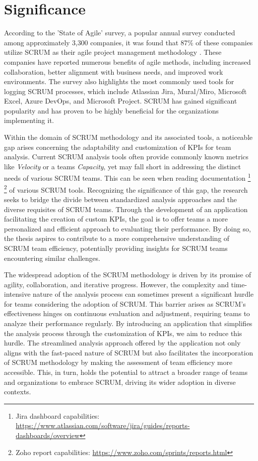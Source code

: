\section{Significance}

According to the 'State of Agile' survey, a popular annual survey conducted among 
approximately 3,300 companies, it was found that 87\% of these companies utilize SCRUM 
as their agile project management methodology \parencite{StateOfAgile2023}. 
These companies have reported numerous benefits of agile methods, including increased 
collaboration, better alignment with business needs, and improved work environments. 
The survey also highlights the most commonly used tools for logging SCRUM processes, which 
include Atlassian Jira, Mural/Miro, Microsoft Excel, Azure DevOps, and Microsoft Project. 
SCRUM has gained significant popularity and has proven to be highly beneficial for the 
organizations implementing it.

Within the domain of SCRUM methodology and its associated tools, a noticeable 
gap arises concerning the adaptability and customization of KPIs for team analysis. 
Current SCRUM analysis tools often provide commonly known metrics like \textit{Velocity} or a teams \textit{Capacity}, 
yet may fall short in addressing the distinct needs of various SCRUM teams. 
This can be seen when reading documentation
\footnote{Jira dashboard capabilities: \url{https://www.atlassian.com/software/jira/guides/reports-dashboards/overview}}
\footnote{Zoho report capabilities: \url{https://www.zoho.com/sprints/reports.html}} of various SCRUM tools.  
Recognizing the significance of this gap, the research seeks to bridge the divide between 
standardized analysis approaches and the diverse requisites of SCRUM teams. 
Through the development of an application facilitating the creation of custom KPIs, 
the goal is to offer teams a more personalized and efficient approach to evaluating 
their performance. By doing so, the thesis aspires to contribute to a more comprehensive 
understanding of SCRUM team efficiency, potentially providing insights for SCRUM teams 
encountering similar challenges.

The widespread adoption of the SCRUM methodology is driven by its promise of agility, collaboration, and iterative progress. However, the complexity and time-intensive nature of the analysis process can sometimes present a significant hurdle for teams considering the adoption of SCRUM. This barrier arises as SCRUM's effectiveness hinges on continuous evaluation and adjustment, requiring teams to analyze their performance regularly. By introducing an application that simplifies the analysis process through the customization of KPIs, we aim to reduce this hurdle. The streamlined analysis approach offered by the application not only aligns with the fast-paced nature of SCRUM but also facilitates the incorporation of SCRUM methodology by making the assessment of team efficiency more accessible. This, in turn, holds the potential to attract a broader range of teams and organizations to embrace SCRUM, driving its wider adoption in diverse contexts.

